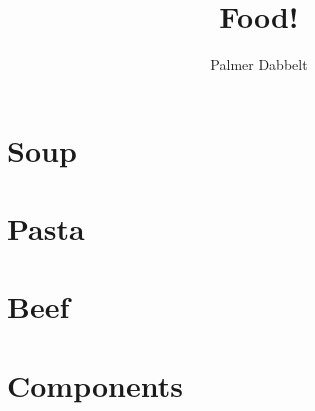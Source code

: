 \documentclass{book}
\author{Palmer Dabbelt}
\title{Food!}
\begin{document}
\maketitle
\tableofcontents
\contentsskip

\newcommand{\maketitle}{}
\renewcommand{\tableofcontents}{}
\newcommand{\author}[1]{}
\newcommand{\title}[1]{}
\renewcommand{\contentsskip}{}
\renewcommand{\bref}[1]{\ref{#1}}

\chapter{Soup}


\chapter{Pasta}


\chapter{Beef}


\chapter{Components}

\end{document}

